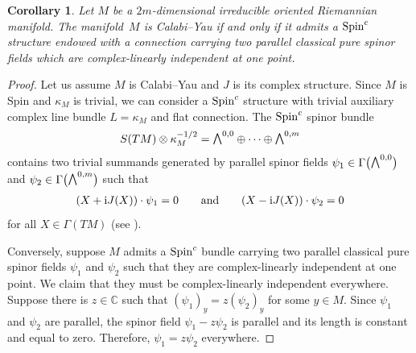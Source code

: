\documentclass[10pt,a4paper]{amsart}
\newcommand{\ext}{\raise1pt\hbox{\small$\bigwedge$}}
\numberwithin{equation}{section}
\newtheorem{Corollary}[Theorem]{Corollary}
\begin{document}
\begin{Corollary}Let $M$ be a $2m$-dimensional irreducible oriented Riemannian manifold. The mani\-fold~$M$ is Calabi--Yau if and only if it admits a ${\rm Spin}^c$ structure endowed with a connection carrying two parallel classical pure spinor fields which are complex-linearly independent at one point.
\end{Corollary}
\begin{proof} Let us assume $M$ is Calabi--Yau and $J$ is its complex structure. Since $M$ is Spin and $\kappa_M$ is trivial, we can consider a ${\rm Spin}^c$ structure with trivial auxiliary complex line bundle $L=\kappa_M$ and flat connection. The ${\rm Spin}^c$ spinor bundle
\begin{gather*}S(TM)\otimes \kappa_M^{-1/2} =
 \ext^{0,0}\oplus \cdots \oplus \ext^{0,m}
\end{gather*}
contains two trivial summands generated by parallel spinor fields $\psi_1\in\Gamma\big(\ext^{0,0}\big)$ and $\psi_2\in\Gamma\big(\ext^{0,m}\big)$ such that
\begin{gather*}(X+{\rm i} J(X))\cdot\psi_1=0 \qquad\text{and}\qquad (X-{\rm i} J(X))\cdot\psi_2=0\end{gather*}
for all $X\in \Gamma(TM)$ (see \cite{Friedrich}).

Conversely, suppose $M$ admits a ${\rm Spin}^c$ bundle carrying two parallel classical pure spinor fields $\psi_1$ and $\psi_2$ such that they are complex-linearly independent at one point. We claim that they must be complex-linearly independent everywhere. Suppose there is $z\in\mathbb{C}$ such that $(\psi_1)_y=z(\psi_2)_y$ for some $y\in M$. Since $\psi_1$ and $\psi_2$ are parallel, the spinor field $\psi_1-z\psi_2$ is parallel and its length is constant and equal to zero. Therefore, $\psi_1=z\psi_2$ everywhere.


\end{proof}
\end{document}
